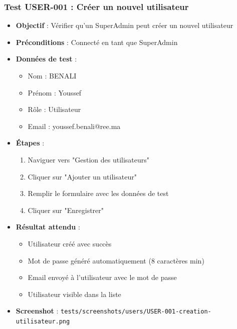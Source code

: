 \subsubsection{Test USER-001 : Créer un nouvel utilisateur}
\begin{itemize}
    \item \textbf{Objectif} : Vérifier qu'un SuperAdmin peut créer un nouvel utilisateur
    \item \textbf{Préconditions} : Connecté en tant que SuperAdmin
    \item \textbf{Données de test} :
        \begin{itemize}
            \item Nom : BENALI
            \item Prénom : Youssef
            \item Rôle : Utilisateur
            \item Email : youssef.benali@ree.ma
        \end{itemize}
    \item \textbf{Étapes} :
        \begin{enumerate}
            \item Naviguer vers "Gestion des utilisateurs"
            \item Cliquer sur "Ajouter un utilisateur"
            \item Remplir le formulaire avec les données de test
            \item Cliquer sur "Enregistrer"
        \end{enumerate}
    \item \textbf{Résultat attendu} : 
        \begin{itemize}
            \item Utilisateur créé avec succès
            \item Mot de passe généré automatiquement (8 caractères min)
            \item Email envoyé à l'utilisateur avec le mot de passe
            \item Utilisateur visible dans la liste
        \end{itemize}
    \item \textbf{Screenshot} : \texttt{tests/screenshots/users/USER-001-creation-utilisateur.png}
\end{itemize}

